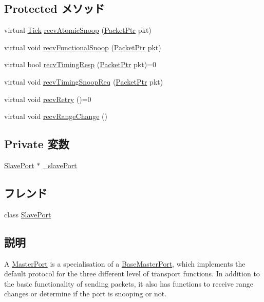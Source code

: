 \subsection*{Protected メソッド}
\begin{DoxyCompactItemize}
\item 
virtual \hyperlink{base_2types_8hh_a5c8ed81b7d238c9083e1037ba6d61643}{Tick} \hyperlink{classMasterPort_ae1160d8f94f042aba1dc9a07a72e1e82}{recvAtomicSnoop} (\hyperlink{classPacket}{PacketPtr} pkt)
\item 
virtual void \hyperlink{classMasterPort_af5b15bc08781cf0ba6190efc37d5b67e}{recvFunctionalSnoop} (\hyperlink{classPacket}{PacketPtr} pkt)
\item 
virtual bool \hyperlink{classMasterPort_abd323548d6c93f8b0543f1fe3a86ca35}{recvTimingResp} (\hyperlink{classPacket}{PacketPtr} pkt)=0
\item 
virtual void \hyperlink{classMasterPort_ae43c73eff109f907118829fcfa9e7096}{recvTimingSnoopReq} (\hyperlink{classPacket}{PacketPtr} pkt)
\item 
virtual void \hyperlink{classMasterPort_ac1ccc3bcf7ebabb20b57fab99b2be5b0}{recvRetry} ()=0
\item 
virtual void \hyperlink{classMasterPort_af60d9c2c17fb4c9ebc5384a7e0c9f289}{recvRangeChange} ()
\end{DoxyCompactItemize}
\subsection*{Private 変数}
\begin{DoxyCompactItemize}
\item 
\hyperlink{classSlavePort}{SlavePort} $\ast$ \hyperlink{classMasterPort_a33e3b01a66e2118c0e01887bd905e904}{\_\-slavePort}
\end{DoxyCompactItemize}
\subsection*{フレンド}
\begin{DoxyCompactItemize}
\item 
class \hyperlink{classMasterPort_a5344d902f61e69b03cd4d737c6375ce3}{SlavePort}
\end{DoxyCompactItemize}


\subsection{説明}
A \hyperlink{classMasterPort}{MasterPort} is a specialisation of a \hyperlink{classBaseMasterPort}{BaseMasterPort}, which implements the default protocol for the three different level of transport functions. In addition to the basic functionality of sending packets, it also has functions to receive range changes or determine if the port is snooping or not. 

